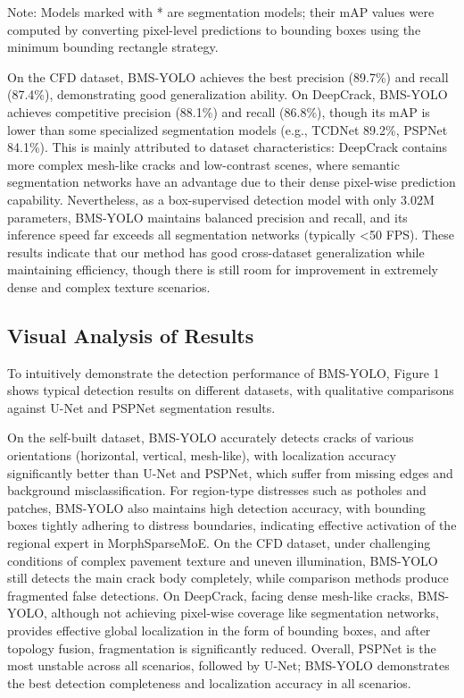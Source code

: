 \documentclass[twocolumn]{sn-jnl}
\begin{document}
	Note: Models marked with * are segmentation models; their mAP values were computed by converting pixel-level predictions to bounding boxes using the minimum bounding rectangle strategy.
	
	On the CFD dataset, BMS-YOLO achieves the best precision (89.7\%) and recall (87.4\%), demonstrating good generalization ability. On DeepCrack, BMS-YOLO achieves competitive precision (88.1\%) and recall (86.8\%), though its mAP is lower than some specialized segmentation models (e.g., TCDNet 89.2\%, PSPNet 84.1\%). This is mainly attributed to dataset characteristics: DeepCrack contains more complex mesh-like cracks and low-contrast scenes, where semantic segmentation networks have an advantage due to their dense pixel-wise prediction capability. Nevertheless, as a box-supervised detection model with only 3.02M parameters, BMS-YOLO maintains balanced precision and recall, and its inference speed far exceeds all segmentation networks (typically <50 FPS). These results indicate that our method has good cross-dataset generalization while maintaining efficiency, though there is still room for improvement in extremely dense and complex texture scenarios.
	
	\subsection{Visual Analysis of Results}
	To intuitively demonstrate the detection performance of BMS-YOLO, Figure 1 shows typical detection results on different datasets, with qualitative comparisons against U-Net and PSPNet segmentation results.
	
	On the self-built dataset, BMS-YOLO accurately detects cracks of various orientations (horizontal, vertical, mesh-like), with localization accuracy significantly better than U-Net and PSPNet, which suffer from missing edges and background misclassification. For region-type distresses such as potholes and patches, BMS-YOLO also maintains high detection accuracy, with bounding boxes tightly adhering to distress boundaries, indicating effective activation of the regional expert in MorphSparseMoE. On the CFD dataset, under challenging conditions of complex pavement texture and uneven illumination, BMS-YOLO still detects the main crack body completely, while comparison methods produce fragmented false detections. On DeepCrack, facing dense mesh-like cracks, BMS-YOLO, although not achieving pixel-wise coverage like segmentation networks, provides effective global localization in the form of bounding boxes, and after topology fusion, fragmentation is significantly reduced. Overall, PSPNet is the most unstable across all scenarios, followed by U-Net; BMS-YOLO demonstrates the best detection completeness and localization accuracy in all scenarios.
	
\end{document}
